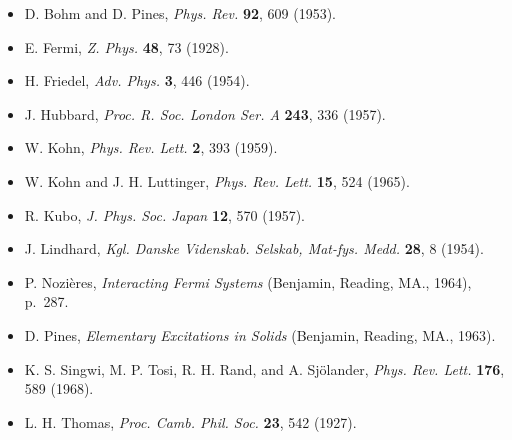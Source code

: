 \begin{itemize}[leftmargin=2em,itemsep=0pt,parsep=0pt,label={}]
\item [BP1953] D. Bohm and D. Pines, \emph{Phys. Rev.} \textbf{92}, 609 (1953).
\item [F1928] E. Fermi, \emph{Z. Phys.} \textbf{48}, 73 (1928).
\item [F1954] H. Friedel, \emph{Adv. Phys.} \textbf{3}, 446 (1954).
\item [H1957] J. Hubbard, \emph{Proc. R. Soc. London Ser. A} \textbf{243}, 336 (1957).
\item [K1959] W. Kohn, \emph{Phys. Rev. Lett.} \textbf{2}, 393 (1959).
\item [KL1965] W. Kohn and J. H. Luttinger, \emph{Phys. Rev. Lett.} \textbf{15}, 524 (1965).
\item [K1957] R. Kubo, \emph{J. Phys. Soc. Japan} \textbf{12}, 570 (1957).
\item [L1954] J. Lindhard, \emph{Kgl. Danske Videnskab. Selskab, Mat-fys. Medd.} \textbf{28}, 8 (1954).
\item [N1964] P. Nozi\`eres, \emph{Interacting Fermi Systems} (Benjamin, Reading, MA., 1964), p.~287.
\item [P1963] D. Pines, \emph{Elementary Excitations in Solids} (Benjamin, Reading, MA., 1963).
\item [STLS1968] K. S. Singwi, M. P. Tosi, R. H. Rand, and A. Sj\"olander, \emph{Phys. Rev. Lett.} \textbf{176}, 589 (1968).
\item [T1927] L. H. Thomas, \emph{Proc. Camb. Phil. Soc.} \textbf{23}, 542 (1927).
\end{itemize}
